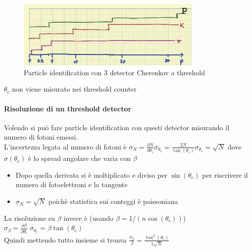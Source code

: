 \begin{figure}[H]
    \centering
    \includegraphics[width=0.8\textwidth,frame]{Chapters/images/Particle_identification/image-20220317185548344.png}
    \captionsetup{width=0.8\textwidth}
    \caption{Particle identification con 3 detector Cherenkov a threshold}
    \label{fig:}
\end{figure}

\begin{note}
    $\theta_c$ non viene misurato nei threshold counter

\end{note}
\vspace{-10pt}
\paragraph*{Risoluzione di un threshold detector}
Volendo si può fare particle identification con questi detector misurando il numero di fotoni emessi.
\\ 
L'incertezza legata al numero di fotoni è
 $\sigma_N=\frac{\partial N}{\partial \theta_c}\sigma_{\theta_c}=\frac{2N}{\tan(\theta_c)}\sigma_{\theta_c}= \sqrt{N}$ dove $\sigma(\theta_c)$ è lo spread angolare che varia con $\beta$
 \begin{details}
    \begin{itemize}
        \item Dopo quella derivata si è moltiplicato e diviso per $\sin(\theta_c)$ per riscrivere il numero di fotoelettroni e la tangente
        \item $\sigma_N=\sqrt{N}$ poichè statistica sui conteggi è poissoniana

    \end{itemize}
 
 \end{details}
 La risoluzione su $\beta$ invece è  (usando $\beta=1/(n \cos(\theta_c))$)
$\sigma_\beta=\frac{\partial \beta}{\partial \theta_c} \; \sigma_{\theta_c}=\beta \tan(\theta_c)$
\\ 
Quindi mettendo tutto insieme si tronva $\frac{\sigma_\beta}{\beta}=\frac{\tan^2(\theta_c)}{1\sqrt{N}}$

